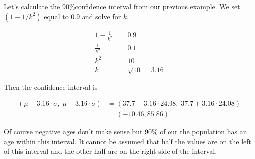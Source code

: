 Let's calculate the 90\%confidence interval from our previous example. We set $(1-1/k^2)$ equal to 0.9 and solve for $k$.

\begin{align*}
	1-\frac{1}{k^2} & = 0.9 \\
	\frac{1}{k^2} & = 0.1 \\ 
	k^2 & = 10 \\
	k & = \sqrt{10} = 3.16
\end{align*}

Then the confidence interval is

\begin{align*}
	(\mu - 3.16\cdot \sigma,\; \mu + 3.16\cdot \sigma) & = (37.7 - 3.16\cdot 24.08,\; 37.7 + 3.16\cdot 24.08) \\
	& = (-10.46, 85.86)
\end{align*}

Of course negative ages don't make sense but 90\% of our the population has an age within this interval.
It cannot be assumed that half the values are on the left of this interval and the other half are on the right side of the interval.
